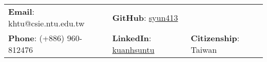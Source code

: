\documentclass[letterpaper, 11pt]{article}
\begin{document}

\vspace{0.5cm}
\begin{center}
\begin{tabular}{lll}
\textbf{Email}: khtu@csie.ntu.edu.tw & \hspace{0.55in} \textbf{GitHub}: \href{https://github.com/syun413}{syun413} & \hspace{0.4in} \\
\textbf{Phone}: (+886) 960-812476 & \hspace{0.55in} \textbf{LinkedIn}: \href{https://www.linkedin.com/in/kuanhsuntu}{kuanhsuntu} & \hspace{0.4in} \textbf{Citizenship}: Taiwan
\end{tabular}
\end{center}

\setlength{\tabcolsep}{8pt}
\end{document}
